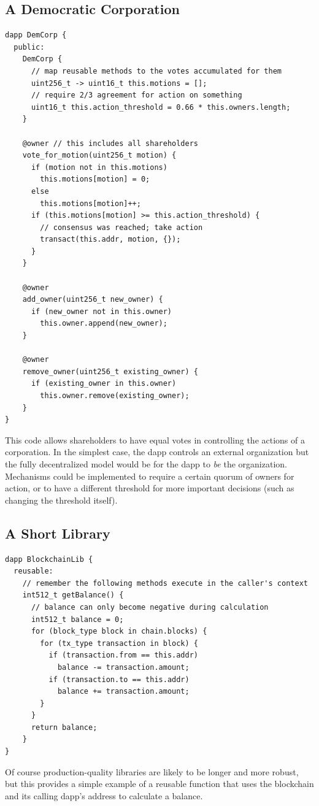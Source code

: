\documentclass[letterpaper]{article}
\begin{document}
\subsection{A Democratic Corporation}
\begin{lstlisting}
dapp DemCorp {
  public:
    DemCorp {
      // map reusable methods to the votes accumulated for them
      uint256_t -> uint16_t this.motions = [];
      // require 2/3 agreement for action on something
      uint16_t this.action_threshold = 0.66 * this.owners.length;
    }
    
    @owner // this includes all shareholders
    vote_for_motion(uint256_t motion) {
      if (motion not in this.motions)
        this.motions[motion] = 0;
      else
        this.motions[motion]++;
      if (this.motions[motion] >= this.action_threshold) {
        // consensus was reached; take action
        transact(this.addr, motion, {});
      }
    }
    
    @owner
    add_owner(uint256_t new_owner) {
      if (new_owner not in this.owner)
        this.owner.append(new_owner);
    }
    
    @owner
    remove_owner(uint256_t existing_owner) {
      if (existing_owner in this.owner)
        this.owner.remove(existing_owner);
    }
}
\end{lstlisting}
This code allows shareholders to have equal votes in controlling the actions of a corporation. In the simplest case, the dapp controls an external organization but the fully decentralized model would be for the dapp to \textit{be} the organization. Mechanisms could be implemented to require a certain quorum of owners for action, or to have a different threshold for more important decisions (such as changing the threshold itself).
\newline

\subsection{A Short Library}
\begin{lstlisting}
dapp BlockchainLib {
  reusable:
    // remember the following methods execute in the caller's context
    int512_t getBalance() {
      // balance can only become negative during calculation
      int512_t balance = 0;
      for (block_type block in chain.blocks) {
        for (tx_type transaction in block) {
          if (transaction.from == this.addr)
            balance -= transaction.amount;
          if (transaction.to == this.addr)
            balance += transaction.amount;
        }
      }
      return balance;
    }
}
\end{lstlisting}
Of course production-quality libraries are likely to be longer and more robust, but this provides a simple example of a reusable function that uses the blockchain and its calling dapp's address to calculate a balance.
\newline
\end{document}

